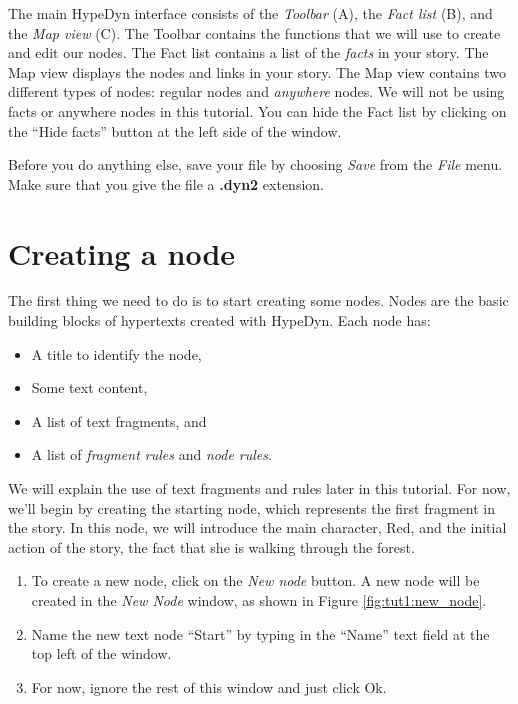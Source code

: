 \documentclass{article}
\begin{document}
The main HypeDyn interface consists of the \textit{Toolbar} (A), the \textit{Fact list} (B), and the \textit{Map view} (C). The Toolbar contains the functions that we will use to create and edit our nodes. The Fact list contains a list of the \textit{facts} in your story. The Map view displays the nodes and links in your story. The Map view contains two different types of nodes: regular nodes and \textit{anywhere} nodes. We will not be using facts or anywhere nodes in this tutorial. You can hide the Fact list by clicking on the ``Hide facts'' button at the left side of the window.

Before you do anything else, save your file by choosing \textit{Save} from the \textit{File} menu. Make sure that you give the file a \textbf{.dyn2} extension.

\section{Creating a node}

The first thing we need to do is to start creating some nodes. Nodes are the basic building blocks of hypertexts created with HypeDyn.
Each node has: 
\begin{itemize}
  \item A title to identify the node,
  \item Some text content,
  \item A list of text fragments, and
  \item A list of \textit{fragment rules} and \textit{node rules}.
\end{itemize}

We will explain the use of text fragments and rules later in this tutorial. For now, we'll begin by creating the starting node, which represents the first fragment in the story. In this node, we will introduce the main character, Red, and the initial action of the story, the fact that she is walking through the forest.
 
\begin{enumerate}
  \item To create a new node, click on the \textit{New node} button. A new node will be created in the \textit{New Node} window, as shown in Figure \ref{fig:tut1:new_node}.
  \item Name the new text node ``Start'' by typing in the ``Name'' text field at the top left of the window. 
  \item For now, ignore the rest of this window and just click Ok.
\end{enumerate}
 
\end{document}

